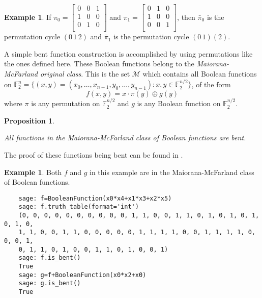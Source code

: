 \documentclass[english]{article}
\def\gftwo{\mathbb{F}_2}
\theoremstyle{plain}
\newtheorem{proposition}[theorem]{Proposition}%
\theoremstyle{definition}
\newtheorem{example}[theorem]{Example}
\theoremstyle{remark}
\begin{document}
\begin{example}
  If $\pi_0=\begin{bmatrix}
               0&0&1\\
               1&0&0\\
               0&1&0\\
             \end{bmatrix}$ and $\pi_1=
             \begin{bmatrix}
               0&1&0\\
               1&0&0\\
               0&0&1\\
             \end{bmatrix}$, then $\bar{\pi}_0$ is the permutation cycle $(0\,1\,2)$
             and $\bar{\pi}_1$ is the permutation cycle $(0\,1)(2)$.
\end{example}
\par A simple bent function construction is accomplished by using permutations
like the ones defined here. These Boolean functions belong to the {\it
Maiorana-McFarland original class}. This is the set
$\mathcal{M}$ which contains all Boolean functions on
$\gftwo^n=\{(x,y)=(x_0,\dots,x_{n-1},y_0,\dots,y_{n-1}):x,y\in\gftwo^{n/2}\}$, of the form
  \[
  f(x,y)=x\cdot\pi(y)\oplus g(y)
  \]
where $\pi$ is any permutation on $\gftwo^{n/2}$ and $g$ is any Boolean
function on $\gftwo^{n/2}$.

\begin{proposition}{\rm\cite{col:c06}}
\par All functions in the Maiorana-McFarland class of Boolean functions are
bent.
\end{proposition}
\par The proof of these functions being bent can be found in \cite{col:c06}.


\begin{example}
  \par Both $f$ and $g$ in this example are in the Maiorana-McFarland class of
  Boolean functions.
  \begin{lstlisting}
    sage: f=BooleanFunction(x0*x4+x1*x3+x2*x5)
    sage: f.truth_table(format='int')
    (0, 0, 0, 0, 0, 0, 0, 0, 0, 0, 1, 1, 0, 0, 1, 1, 0, 1, 0, 1, 0, 1, 0, 1, 0,
    1, 1, 0, 0, 1, 1, 0, 0, 0, 0, 0, 1, 1, 1, 1, 0, 0, 1, 1, 1, 1, 0, 0, 0, 1,
    0, 1, 1, 0, 1, 0, 0, 1, 1, 0, 1, 0, 0, 1)
    sage: f.is_bent()
    True
    sage: g=f+BooleanFunction(x0*x2+x0)
    sage: g.is_bent()
    True
  \end{lstlisting}
\end{example}
\end{document}
